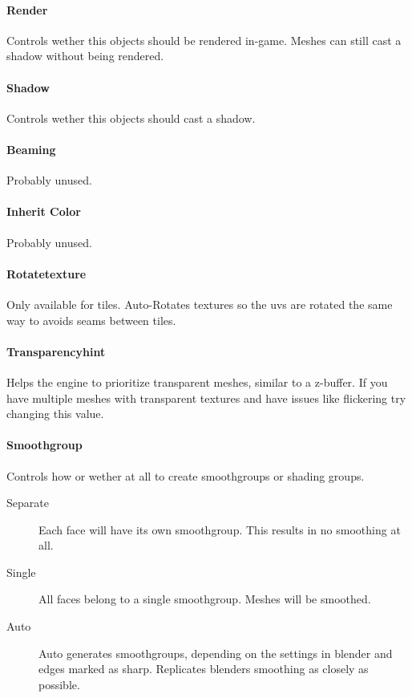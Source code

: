 \paragraph*{Render}
Controls wether this objects should be rendered in-game. Meshes can still
cast a shadow without being rendered.

\paragraph*{Shadow}
Controls wether this objects should cast a shadow.

\paragraph*{Beaming}
Probably unused.

\paragraph*{Inherit Color}
Probably unused.

\paragraph*{Rotatetexture}
Only available for tiles. Auto-Rotates textures so the uvs are rotated
the same way to avoids seams between tiles.

\paragraph*{Transparencyhint}
Helps the engine to prioritize transparent meshes, similar to a z-buffer. If
you have multiple meshes with transparent textures and have issues like
flickering try changing this value.

\paragraph*{Smoothgroup}
Controls how or wether at all to create smoothgroups or shading groups.
\begin{description}
    \item[Separate] Each face will have its own smoothgroup. This results in no smoothing at all.
    \item[Single] All faces belong to a single smoothgroup. Meshes will be smoothed.
    \item[Auto] Auto generates smoothgroups, depending on the settings in blender and edges marked as sharp. Replicates blenders smoothing as closely as possible.
\end{description}

